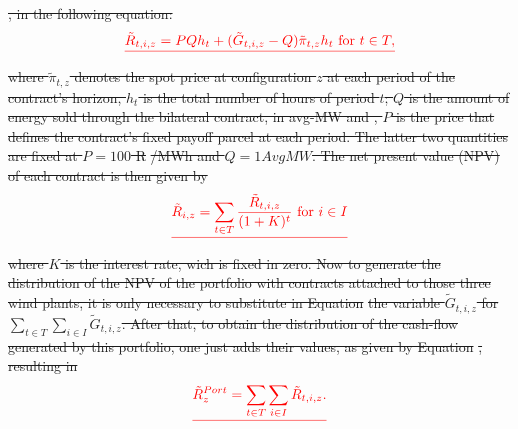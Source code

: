 \documentclass[a4paper]{IEEEtran}
\providecommand{\DIFdel}[1]{{\protect\color{red}\sout{#1}}}                      %
\begin{document}
\DIFdel{, in the following equation: 
}\begin{align*}\DIFdel{
\tilde{R}_{t,i,z}=PQh_{t}+(\tilde{G}_{t,i,z}-Q) \tilde{\pi}_{t,z}h_{t}\,\, \mbox{for}\,\, t \in T, \label{eqrisk2}
}\end{align*}
\DIFdel{where $\tilde{\pi}_{t,z}$ denotes the spot price at configuration $z$ at each period of the contract's horizon, $h_{t}$ is the total number of hours of period $t$; $Q$ is the amount of energy sold through the bilateral contract, in avg-MW and , $P$ is the price that defines the contract's fixed payoff parcel at each period. The latter two quantities are fixed at $P=100$ R}%
\DIFdel{/MWh and $Q=1AvgMW$. The net present value (NPV) of each contract is then given by }\begin{align*}\DIFdel{
\tilde{R}_{i,z}=\sum_{t\in T}{\frac{\tilde{R}_{t,i,z}}{(1+K)^{t}}}\,\, \mbox{for} \,\, i\in I
}\end{align*}
\DIFdel{where $K$ is the interest rate, wich is fixed in zero. Now to generate the distribution of the NPV of the portfolio with contracts attached to those three wind plants, it is only necessary to substitute in Equation }%
\DIFdel{the variable $\tilde{G}_{t,i,z}$ for $\sum_{t\in T}{\sum_{i\in I}{\tilde{G}}_{t,i,z}}$. After that, to obtain the distribution of the cash-flow generated by this portfolio, one just adds their values, as given by 
  Equation }%
\DIFdel{, resulting in
}\begin{align*}\DIFdel{
\tilde{R}_{z}^{Port}=\sum_{t\in T}{\sum_{i\in I}{\tilde{R}_{t,i,z}}}.
}\end{align*}
\end{document}
